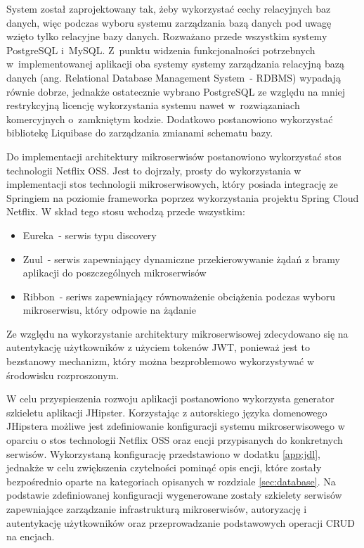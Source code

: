 \par
System został zaprojektowany tak, żeby wykorzystać cechy relacyjnych baz danych,
więc podczas wyboru systemu zarządzania bazą danych pod uwagę wzięto tylko relacyjne bazy danych.
Rozważano przede wszystkim systemy PostgreSQL\cite{tech:postgresql} i~MySQL\cite{tech:mysql}.
Z~punktu widzenia funkcjonalności potrzebnych w~implementowanej aplikacji oba systemy systemy zarządzania relacyjną bazą danych (ang. Relational Database Management System~- RDBMS) wypadają równie dobrze,
jednakże ostatecznie wybrano PostgreSQL ze względu na mniej restrykcyjną licencję wykorzystania systemu nawet w~rozwiązaniach komercyjnych o~zamkniętym kodzie.
Dodatkowo postanowiono wykorzystać bibliotekę Liquibase\cite{tech:liquibase} do zarządzania zmianami schematu bazy.

\par
Do implementacji architektury mikroserwisów postanowiono wykorzystać stos technologii Netflix OSS\cite{tech:netflix-oss}.
Jest to dojrzały, prosty do wykorzystania w implementacji stos technologii mikroserwisowych,
który posiada integrację ze Springiem na poziomie frameworka poprzez wykorzystania projektu Spring Cloud Netflix\cite{tech:spring-cloud-netflix}.
W skład tego stosu wchodzą przede wszystkim:
\begin{itemize}
    \item Eureka\cite{tech:netflix-eureka}~- serwis typu discovery
    \item Zuul\cite{tech:netflix-zuul}~- serwis zapewniający dynamiczne przekierowywanie żądań z bramy aplikacji do poszczególnych mikroserwisów
    \item Ribbon\cite{tech:netflix-ribbon}~- seriws zapewniający równoważenie obciążenia podczas wyboru mikroserwisu, który odpowie na żądanie
\end{itemize}

\par
Ze względu na wykorzystanie architektury mikroserwisowej zdecydowano się na autentykację użytkowników z użyciem tokenów JWT\cite{url:jwt},
ponieważ jest to bezstanowy mechanizm, który można bezproblemowo wykorzystywać w środowisku rozproszonym.

\par
W celu przyspieszenia rozwoju aplikacji postanowiono wykorzysta generator szkieletu aplikacji JHipster\cite{tech:jhipster}.
Korzystając z autorskiego języka domenowego JHipstera możliwe jest zdefiniowanie konfiguracji systemu mikroserwisowego w oparciu o stos technologii Netflix OSS oraz encji przypisanych do konkretnych serwisów.
Wykorzystaną konfigurację przedstawiono w dodatku \ref{app:jdl}, jednakże w celu zwiększenia czytelności pominąć opis encji, które zostały bezpośrednio oparte na kategoriach opisanych w rozdziale \ref{sec:database}.
Na podstawie zdefiniowanej konfiguracji wygenerowane zostały szkielety serwisów zapewniające zarządzanie infrastrukturą mikroserwisów, autoryzację i autentykację użytkowników oraz przeprowadzanie podstawowych operacji CRUD na encjach.

